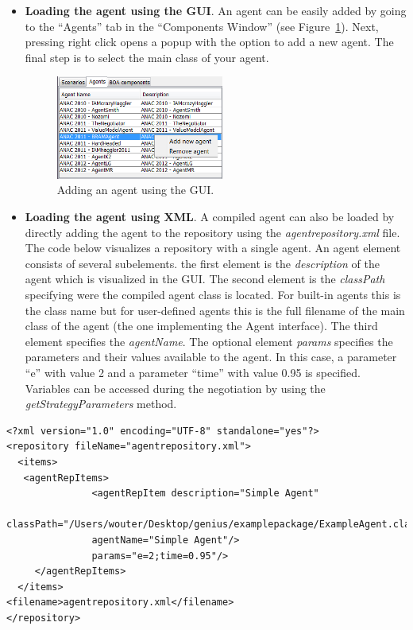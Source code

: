 \documentclass[]{article}
\begin{document}
\begin{itemize}	
\item \textbf{Loading the agent using the GUI}. An agent can be easily added by going to the ``Agents'' tab in the ``Components Window'' (see Figure~\ref{fig:addAgent}). Next, pressing right click opens a popup with the option to add a new agent. The final step is to select the main class of your agent.

\begin{figure}[h] 
	\center
	\includegraphics[width=5.5cm]{media/AddAgent.png}
	\caption{Adding an agent using the GUI.}
	\label{fig:addAgent}
\end{figure}

\item \textbf{Loading the agent using XML}. A compiled agent can also be loaded by directly adding the agent to the repository using the \textit{agentrepository.xml} file. The code below visualizes a repository with a single agent. An agent element consists of several subelements. the first element is the \textit{description} of the agent which is visualized in the GUI. The second element is the \textit{classPath} specifying were the compiled agent class is located. For built-in agents this is the class name but for user-defined agents this is the full filename of the main class of the agent (the one implementing the Agent interface). The third element specifies the \textit{agentName}. The optional element \textit{params} specifies the parameters and their values available to the agent. In this case, a parameter ``e'' with value 2 and a parameter ``time'' with value 0.95 is specified. Variables can be accessed during the negotiation by using the \textit{getStrategyParameters} method.
\end{itemize}

\begin{lstlisting}
<?xml version="1.0" encoding="UTF-8" standalone="yes"?>
<repository fileName="agentrepository.xml">
  <items>
   <agentRepItems>
               <agentRepItem description="Simple Agent" 
               classPath="/Users/wouter/Desktop/genius/examplepackage/ExampleAgent.class"
               agentName="Simple Agent"/>
               params="e=2;time=0.95"/>
     </agentRepItems>
  </items>
<filename>agentrepository.xml</filename>
</repository>
\end{lstlisting}
\end{document}
